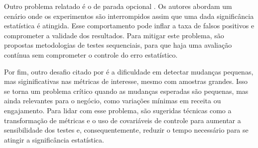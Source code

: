 Outro problema relatado é o de parada opcional . Os autores abordam um cenário onde os experimentos são interrompidos assim que uma dada significância estatística é atingida. Esse comportamento pode inflar a taxa de falsos positivos e comprometer a validade dos resultados. Para mitigar este problema, são propostas metodologias de testes sequenciais, para que haja uma avaliação contínua sem comprometer o controle do erro estatístico.

Por fim, outro desafio citado por  é a dificuldade em detectar mudanças pequenas, mas siginificativas nas métricas de interesse, mesmo com amostras grandes. Isso se torna um problema crítico quando as mudanças esperadas são pequenas, mas ainda relevantes para o negócio, como variações mínimas em receita ou engajamento. Para lidar com esse problema, são sugeridas técnicas como a transformação de métricas e o uso de covariáveis de controle para aumentar a sensibilidade dos testes e, consequentemente, reduzir o tempo necessário para se atingir a significância estatística.
